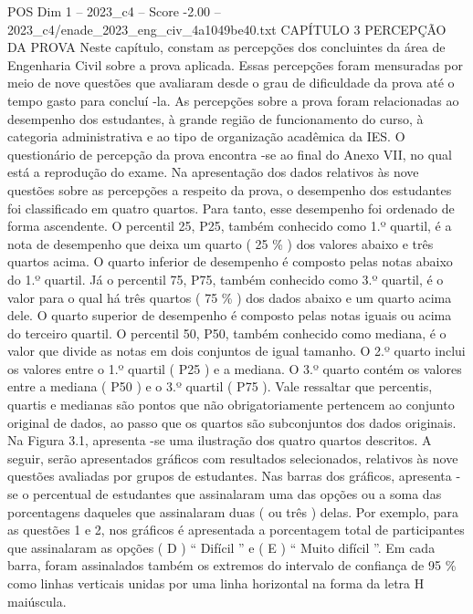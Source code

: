\begin{textsample}{POS Dim 1 – 2023\_c4 – Score -2.00 – 2023\_c4/enade\_2023\_eng\_civ\_4a1049be40.txt}  \label{ex:f1_pos_197}
CAPÍTULO 3 PERCEPÇÃO DA PROVA Neste capítulo, constam as percepções dos concluintes da área de Engenharia Civil sobre a prova aplicada.
Essas percepções foram mensuradas por meio de nove questões que avaliaram desde o grau de dificuldade da prova até o tempo gasto para concluí -la.
As percepções sobre a prova foram relacionadas ao desempenho dos estudantes, à grande região de funcionamento do curso, à categoria administrativa e ao tipo de organização acadêmica da IES.
O questionário de percepção da prova encontra -se ao final do Anexo VII, no qual está a reprodução do exame.
Na apresentação dos dados relativos às nove questões sobre as percepções a respeito da prova, o desempenho dos estudantes foi classificado em quatro quartos.
Para tanto, esse desempenho foi ordenado de forma ascendente.
O percentil 25, P25, também conhecido como 1.º quartil, é a nota de desempenho que deixa um quarto ( 25 \% ) dos valores abaixo e três quartos acima.
O quarto inferior de desempenho é composto pelas notas abaixo do 1.º quartil.
Já o percentil 75, P75, também conhecido como 3.º quartil, é o valor para o qual há três quartos ( 75 \% ) dos dados abaixo e um quarto acima dele.
O quarto superior de desempenho é composto pelas notas iguais ou acima do terceiro quartil.
O percentil 50, P50, também conhecido como mediana, é o valor que divide as notas em dois conjuntos de igual tamanho.
O 2.º quarto inclui os valores entre o 1.º quartil ( P25 ) e a mediana.
O 3.º quarto contém os valores entre a mediana ( P50 ) e o 3.º quartil ( P75 ).
Vale ressaltar que percentis, quartis e medianas são pontos que não obrigatoriamente pertencem ao conjunto original de dados, ao passo que os quartos são subconjuntos dos dados originais.
Na Figura 3.1, apresenta -se uma ilustração dos quatro quartos descritos.
A seguir, serão apresentados gráficos com resultados selecionados, relativos às nove questões avaliadas por grupos de estudantes.
Nas barras dos gráficos, apresenta -se o percentual de estudantes que assinalaram uma das opções ou a soma das porcentagens daqueles que assinalaram duas ( ou três ) delas.
Por exemplo, para as questões 1 e 2, nos gráficos é apresentada a porcentagem total de participantes que assinalaram as opções ( D ) “ Difícil ” e ( E ) “ Muito difícil ”.
Em cada barra, foram assinalados também os extremos do intervalo de confiança de 95 \% como linhas verticais unidas por uma linha horizontal na forma da letra H maiúscula.

\end{textsample}
